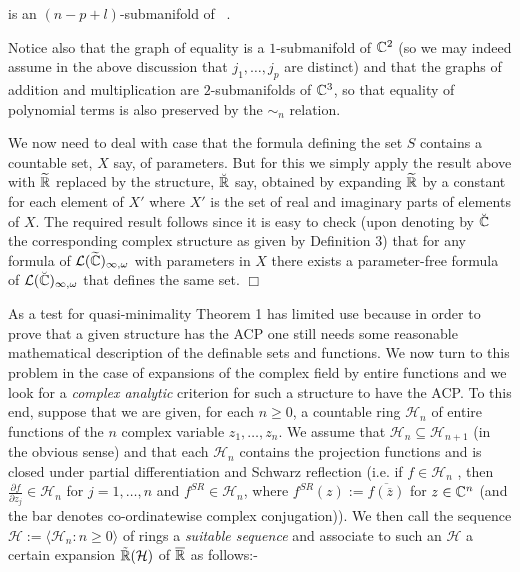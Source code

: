 \documentclass[12pt,nodate]{article}
\begin{document}
is an $(n-p+l)$-submanifold of \Cn\ . 

 \vspace{2mm}
 
 Notice also that the graph of equality is a $1$-submanifold of $\mathbb{C}^2$ (so we may indeed assume in the above discussion that $j_1 , \ldots , j_p$ are distinct) and that the graphs of addition and multiplication are $2$-submanifolds of $\mathbb{C}^3$, so that  equality of polynomial terms is also preserved by the $\sim_n$ relation. 
 
 \vspace{2mm}
 
 We now need to deal with case that the formula defining the set $S$ contains a countable set, $X$ say, of parameters. But for this we simply apply the result above with $\widetilde{\mathbb{R}}$ replaced by the structure, $\breve{\mathbb{R}}$ say, obtained by expanding $\widetilde{\mathbb{R}}$ by a constant for each element of $X'$ where $X'$ is the set of real and imaginary parts of elements of $X$. The required result follows since it is easy to check (upon denoting by $\breve{\mathbb{C}}$ the corresponding complex structure as given by Definition 3) that for any formula of $\mathcal{L}(\widetilde{\mathbb{C}})_{\infty , \omega}$ with parameters in $X$ there exists a parameter-free formula of 
 $\mathcal{L}(\breve{\mathbb{C}})_{\infty , \omega}$ that defines the same set. $\Box$
 
 \vspace{4mm}
 
 
 As a test for quasi-minimality Theorem 1 has limited use because in order to prove that a given structure has the ACP one still needs some reasonable mathematical description of the definable sets and functions. We now turn to this problem in the case of expansions of the complex field by entire functions and we look for a \emph{complex analytic} criterion for such a structure to have the ACP.
 To this end, suppose that we are given, for each $n \geq 0$, a countable ring $\mathcal{H}_n$ of entire functions of the $n$ complex variable $z_1 , \ldots , z_n$. We assume that $\mathcal{H}_n \subseteq \mathcal{H}_{n+1}$  (in the obvious sense) and that each $\mathcal{H}_n$ contains the projection functions and is closed under partial differentiation and Schwarz reflection (i.e. if $f \in \mathcal{H}_n$ , then $\frac{\partial f}{\partial z_j} \in \mathcal{H}_n$ for $j = 1, \ldots , n$ and $f^{SR} \in   \mathcal{H}_n$, where $f^{SR}(z) := \overline{f(\overline{z} )}$ for $z \in \mathbb{C}^{n}$ (and the bar denotes co-ordinatewise complex conjugation)).  We then call the sequence $\mathcal{H} := \langle  \mathcal{H}_n : n \geq 0 \rangle$ of rings  a \emph{suitable sequence} and associate to such an  $\mathcal{H}$ a certain expansion $\tilde{\mathbb{R}}( 
 \mathcal{H})$ of $\overline{\mathbb{R}}$ as follows:-
 
\end{document}
